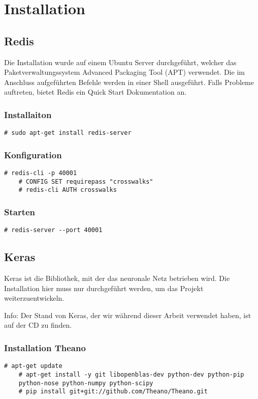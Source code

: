 \section{Installation}
\subsection{Redis}
\label{subsec:redis}
Die Installation wurde auf einem Ubuntu Server durchgeführt, welcher das Paketverwaltungssystem Advanced Packaging Tool (APT) verwendet. Die im Anschluss aufgeführten Befehle werden in einer Shell ausgeführt.
Falls Probleme auftreten, bietet Redis ein Quick Start Dokumentation an.

\subsubsection{Installaiton}
\begin{lstlisting}[style=BashInputStyle]
	# sudo apt-get install redis-server
\end{lstlisting}

\subsubsection{Konfiguration}
\begin{lstlisting}[style=BashInputStyle]
	# redis-cli -p 40001
	# CONFIG SET requirepass "crosswalks"
	# redis-cli AUTH crosswalks
\end{lstlisting}

\subsubsection{Starten}
\begin{lstlisting}[style=BashInputStyle]
	# redis-server --port 40001
\end{lstlisting}

\subsection{Keras}
Keras ist die Bibliothek, mit der das neuronale Netz betrieben wird. Die Installation hier muss nur durchgeführt werden, um das Projekt weiterzuentwickeln.

Info: Der Stand von Keras, der wir während dieser Arbeit verwendet haben, ist auf der CD zu finden.
\subsubsection{Installation Theano}
\begin{lstlisting}[style=BashInputStyle]
	# apt-get update
	# apt-get install -y git libopenblas-dev python-dev python-pip 
	python-nose python-numpy python-scipy
	# pip install git+git://github.com/Theano/Theano.git
\end{lstlisting}
